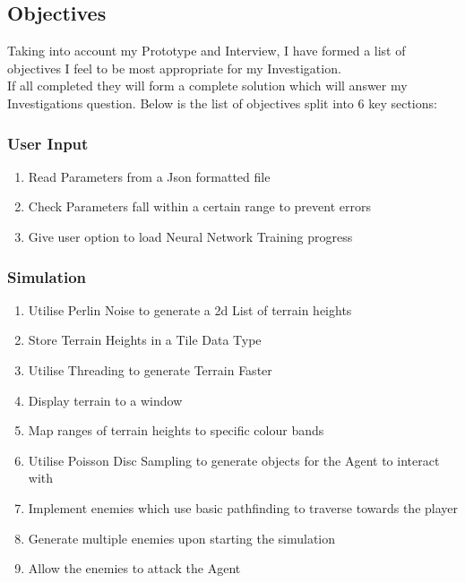 \begin{flushleft}
            \pagebreak
        \subsection{Objectives}
            \large
            Taking into account my Prototype and Interview, I have formed a list of objectives I feel to be most 
            appropriate for my Investigation.\\
            \vspace{0.2cm}
            If all completed they will form a complete solution which will answer my Investigations question.
            Below is the list of objectives split into 6 key sections:

            \subsubsection*{User Input}
                \begin{enumerate}
                    \item Read Parameters from a Json formatted file
                    \item Check Parameters fall within a certain range to prevent errors
                    \item Give user option to load Neural Network Training progress
                \end{enumerate}
            \subsubsection*{Simulation}
                \begin{enumerate}
                    \item Utilise Perlin Noise to generate a 2d List of terrain heights
                    \item Store Terrain Heights in a Tile Data Type
                    \item Utilise Threading to generate Terrain Faster
                    \item Display terrain to a window
                    \item Map ranges of terrain heights to specific colour bands
                    \item Utilise Poisson Disc Sampling to generate objects for the Agent to interact with
                    \item Implement enemies which use basic pathfinding to traverse towards the player
                    \item Generate multiple enemies upon starting the simulation
                    \item Allow the enemies to attack the Agent
                \end{enumerate}   

\end{flushleft}

